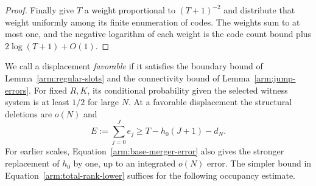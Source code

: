 \begin{proof}
Finally give $T$ a weight proportional to $(T+1)^{-2}$ and distribute
that weight uniformly among its finite enumeration of codes.  The
weights sum to at most one, and the negative logarithm of each weight
is the code count bound plus $2\log(T+1)+O(1)$.
\end{proof}

We call a displacement \emph{favorable} if it satisfies the boundary
bound of Lemma~\ref{arm:regular-slots} and the connectivity bound of
Lemma~\ref{arm:jump-errors}.  For fixed $R,K$, its conditional
probability given the selected witness system is at least $1/2$ for
large $N$.  At a favorable displacement the structural deletions are
$o(N)$ and
\begin{equation}\label{arm:total-rank-lower}
 E:=\sum_{j=0}^Je_j
 \geq T-h_0(J+1)-d_N.
\end{equation}
For earlier scales, Equation~\eqref{arm:base-merger-error} also gives
the stronger replacement of $h_0$ by one, up to an integrated $o(N)$
error.  The simpler bound in Equation~\eqref{arm:total-rank-lower}
suffices for the following occupancy estimate.
